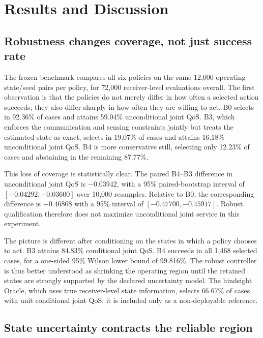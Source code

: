 
\section{Results and Discussion}
\label{sec:results-discussion}

\subsection{Robustness changes coverage, not just success rate}

The frozen benchmark compares all six policies on the same 12,000 operating-state/seed pairs per policy, for 72,000 receiver-level evaluations overall. The first observation is that the policies do not merely differ in how often a selected action succeeds; they also differ sharply in how often they are willing to act. B0 selects in 92.36\% of cases and attains 59.04\% unconditional joint QoS. B3, which enforces the communication and sensing constraints jointly but treats the estimated state as exact, selects in 19.07\% of cases and attains 16.18\% unconditional joint QoS. B4 is more conservative still, selecting only 12.23\% of cases and abstaining in the remaining 87.77\%.

This loss of coverage is statistically clear. The paired B4--B3 difference in unconditional joint QoS is $-0.03942$, with a 95\% paired-bootstrap interval of $[-0.04292,-0.03600]$ over 10,000 resamples. Relative to B0, the corresponding difference is $-0.46808$ with a 95\% interval of $[-0.47700,-0.45917]$. Robust qualification therefore does not maximize unconditional joint service in this experiment.

The picture is different after conditioning on the states in which a policy chooses to act. B3 attains 84.83\% conditional joint QoS. B4 succeeds in all 1,468 selected cases, for a one-sided 95\% Wilson lower bound of 99.816\%. The robust controller is thus better understood as shrinking the operating region until the retained states are strongly supported by the declared uncertainty model. The hindsight Oracle, which uses true receiver-level state information, selects 66.67\% of cases with unit conditional joint QoS; it is included only as a non-deployable reference.

\subsection{State uncertainty contracts the reliable region}

